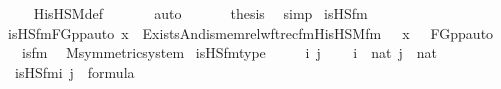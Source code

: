 \begin{isabellebody}
\ \ \ \ \isamarkupfalse%
\ His{\isacharunderscore}{\kern0pt}HS{\isacharunderscore}{\kern0pt}M{\isacharunderscore}{\kern0pt}def\ \isanewline
\ \ \ \ \isamarkupfalse%
\ auto\ \isanewline
\isanewline
\ \ \isamarkupfalse%
\ \isamarkupfalse%
\ {\isacharquery}{\kern0pt}thesis\ \isamarkupfalse%
\ simp\isanewline
{}\isamarkupfalse%
%
\endisatagproof
{\isafoldproof}%
%
\isadelimproof
\isanewline
%
\endisadelimproof
\isanewline
{}\isamarkupfalse%
\isanewline
\isanewline
{}\isamarkupfalse%
\ is{\isacharunderscore}{\kern0pt}HS{\isacharunderscore}{\kern0pt}fm\ \ \isanewline
\ \ {\isachardoublequoteopen}is{\isacharunderscore}{\kern0pt}HS{\isacharunderscore}{\kern0pt}fm{\isacharparenleft}{\kern0pt}FGppauto{\isacharcomma}{\kern0pt}\ x{\isacharparenright}{\kern0pt}\ {\isasymequiv}\ Exists{\isacharparenleft}{\kern0pt}And{\isacharparenleft}{\kern0pt}is{\isacharunderscore}{\kern0pt}memrel{\isacharunderscore}{\kern0pt}wftrec{\isacharunderscore}{\kern0pt}fm{\isacharparenleft}{\kern0pt}His{\isacharunderscore}{\kern0pt}HS{\isacharunderscore}{\kern0pt}M{\isacharunderscore}{\kern0pt}fm{\isacharparenleft}{\kern0pt}{}{\isacharcomma}{\kern0pt}\ {}{\isacharcomma}{\kern0pt}\ {}{\isacharparenright}{\kern0pt}{\isacharcomma}{\kern0pt}\ x\ {\isacharhash}{\kern0pt}{\isacharplus}{\kern0pt}\ {}{\isacharcomma}{\kern0pt}\ FGppauto\ {\isacharhash}{\kern0pt}{\isacharplus}{\kern0pt}\ {}{\isacharcomma}{\kern0pt}\ {}{\isacharparenright}{\kern0pt}{\isacharcomma}{\kern0pt}\ is{\isacharunderscore}{\kern0pt}{}{\isacharunderscore}{\kern0pt}fm{\isacharparenleft}{\kern0pt}{}{\isacharparenright}{\kern0pt}{\isacharparenright}{\kern0pt}{\isacharparenright}{\kern0pt}{\isachardoublequoteclose}\ \isanewline
\isanewline
{}\isamarkupfalse%
\ M{\isacharunderscore}{\kern0pt}symmetric{\isacharunderscore}{\kern0pt}system\isanewline
{}\isanewline
\isanewline
{}\isamarkupfalse%
\ is{\isacharunderscore}{\kern0pt}HS{\isacharunderscore}{\kern0pt}fm{\isacharunderscore}{\kern0pt}type\ {\isacharcolon}{\kern0pt}\ \isanewline
\ \ \ i\ j\ \isanewline
\ \ \ {\isachardoublequoteopen}i\ {\isasymin}\ nat{\isachardoublequoteclose}\ {\isachardoublequoteopen}j\ {\isasymin}\ nat{\isachardoublequoteclose}\ \isanewline
\ \ \ {\isachardoublequoteopen}is{\isacharunderscore}{\kern0pt}HS{\isacharunderscore}{\kern0pt}fm{\isacharparenleft}{\kern0pt}i{\isacharcomma}{\kern0pt}\ j{\isacharparenright}{\kern0pt}\ {\isasymin}\ formula{\isachardoublequoteclose}\ \isanewline

\end{isabellebody}
